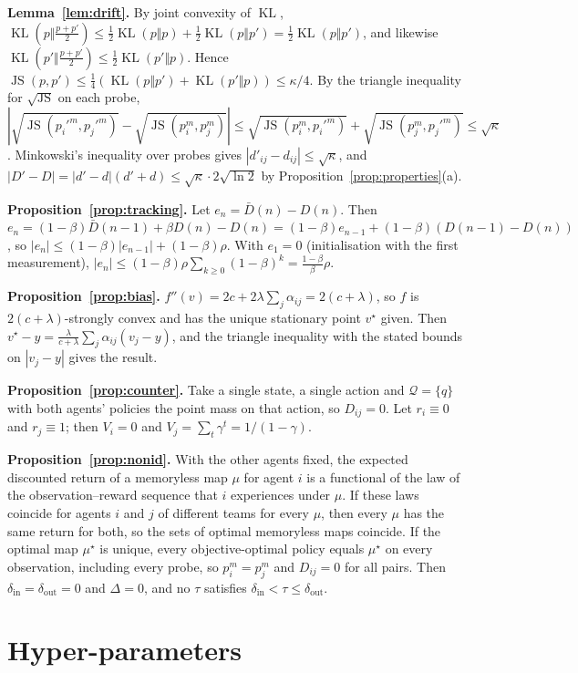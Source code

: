 \documentclass{article}
\theoremstyle{remark}
\newcommand{\JS}{\operatorname{JS}}
\newcommand{\KL}{\operatorname{KL}}
\begin{document}
\textbf{Lemma~\ref{lem:drift}.} By joint convexity of $\KL$, $\KL(p\Vert\frac{p+p'}{2})\le\frac12\KL(p\Vert p)+\frac12\KL(p\Vert p')=\frac12\KL(p\Vert p')$,
and likewise $\KL(p'\Vert\frac{p+p'}{2})\le\frac12\KL(p'\Vert p)$. Hence $\JS(p,p')\le\frac14(\KL(p\Vert p')+\KL(p'\Vert p))\le\kappa/4$. By the
triangle inequality for $\sqrt{\JS}$ on each probe,
$|\sqrt{\JS(p_i'^m,p_j'^m)}-\sqrt{\JS(p_i^m,p_j^m)}|\le\sqrt{\JS(p_i^m,p_i'^m)}+\sqrt{\JS(p_j^m,p_j'^m)}\le\sqrt{\kappa}$. Minkowski's
inequality over probes gives $|d'_{ij}-d_{ij}|\le\sqrt{\kappa}$, and $|D'-D|=|d'-d|(d'+d)\le\sqrt{\kappa}\cdot2\sqrt{\ln 2}$ by
Proposition~\ref{prop:properties}(a).

\textbf{Proposition~\ref{prop:tracking}.} Let $e_n=\bar D(n)-D(n)$. Then $e_n=(1-\beta)\bar D(n-1)+\beta D(n)-D(n)=(1-\beta)e_{n-1}+(1-\beta)(D(n-1)-D(n))$,
so $|e_n|\le(1-\beta)|e_{n-1}|+(1-\beta)\rho$. With $e_1=0$ (initialisation with the first measurement),
$|e_n|\le(1-\beta)\rho\sum_{k\ge0}(1-\beta)^k=\frac{1-\beta}{\beta}\rho$.

\textbf{Proposition~\ref{prop:bias}.} $f''(v)=2c+2\lambda\sum_j\alpha_{ij}=2(c+\lambda)$, so $f$ is $2(c+\lambda)$-strongly convex and has the
unique stationary point $v^\star$ given. Then $v^\star-y=\frac{\lambda}{c+\lambda}\sum_j\alpha_{ij}(v_j-y)$, and the triangle inequality with the
stated bounds on $|v_j-y|$ gives the result.

\textbf{Proposition~\ref{prop:counter}.} Take a single state, a single action and $\mathcal{Q}=\{q\}$ with both agents' policies the point mass on that
action, so $D_{ij}=0$. Let $r_i\equiv0$ and $r_j\equiv1$; then $V_i=0$ and $V_j=\sum_t\gamma^t=1/(1-\gamma)$.

\textbf{Proposition~\ref{prop:nonid}.} With the other agents fixed, the expected discounted return of a memoryless map $\mu$ for agent $i$ is a
functional of the law of the observation--reward sequence that $i$ experiences under $\mu$. If these laws coincide for agents $i$ and $j$ of
different teams for every $\mu$, then every $\mu$ has the same return for both, so the sets of optimal memoryless maps coincide. If the optimal map $\mu^\star$ is unique, every objective-optimal policy equals $\mu^\star$ on every observation, including every
probe, so $p_i^m=p_j^m$ and $D_{ij}=0$ for all pairs. Then $\delta_{\mathrm{in}}=\delta_{\mathrm{out}}=0$ and $\Delta=0$, and no $\tau$ satisfies
$\delta_{\mathrm{in}}<\tau\le\delta_{\mathrm{out}}$.

\section{Hyper-parameters}
\begin{table}[h]
\centering
\small

\caption{Settings of the from-scratch E1 comparison (identical for all methods except the donor set).}
\end{table}
\end{document}
